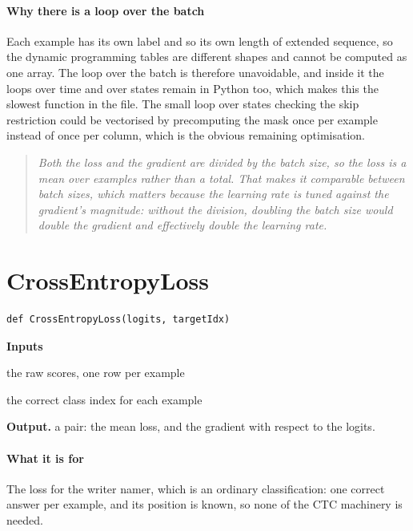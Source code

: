 \paragraph{Why there is a loop over the batch}
Each example has its own label and so its own length of extended sequence, so the dynamic programming tables are different shapes and cannot be computed as one array. The loop over the batch is therefore unavoidable, and inside it the loops over time and over states remain in Python too, which makes this the slowest function in the file. The small loop over states checking the skip restriction could be vectorised by precomputing the mask once per example instead of once per column, which is the obvious remaining optimisation.


\begin{quote}\small\itshape Both the loss and the gradient are divided by the batch size, so the loss is a mean over examples rather than a total. That makes it comparable between batch sizes, which matters because the learning rate is tuned against the gradient's magnitude: without the division, doubling the batch size would double the gradient and effectively double the learning rate.\end{quote}

\section{CrossEntropyLoss}
\begin{lstlisting}[style=sig]
def CrossEntropyLoss(logits, targetIdx)
\end{lstlisting}

\noindent\textbf{Inputs}
\begin{description}[leftmargin=2.2em,style=nextline,font=\normalfont\ttfamily]\setlength\itemsep{1pt}
  \item[{logits}] \normalfont the raw scores, one row per example
  \item[{targetIdx}] \normalfont the correct class index for each example
\end{description}

\noindent\textbf{Output.} a pair: the mean loss, and the gradient with respect to the logits.


\paragraph{What it is for}
The loss for the writer namer, which is an ordinary classification: one correct answer per example, and its position is known, so none of the CTC machinery is needed.


